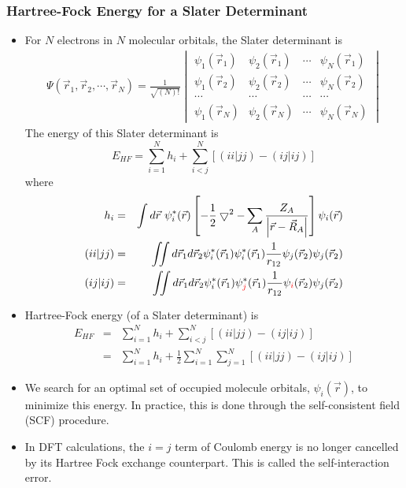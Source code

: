 \documentclass[handout]{beamer} %
\begin{document}
\begin{frame}
\frametitle{Hartree-Fock Energy for a Slater Determinant}

\begin{itemize}

\item  \small{For $N$ electrons in $N$ molecular orbitals, the Slater determinant is }
\footnotesize{
\begin{eqnarray*}
\Psi(\vec{r}_1, \vec{r}_2, \cdots, \vec{r}_N)  = \frac{1}{\sqrt{(N)!}} 
\begin{vmatrix} 
   \psi_{1} (\vec{r}_1)  &  \psi_{2} (\vec{r}_1)  & \cdots &    \psi_{N} (\vec{r}_1) \\
  \psi_{1} (\vec{r}_2)  &  \psi_{2} (\vec{r}_2)  & \cdots &    \psi_{N} (\vec{r}_2) \\
   \cdots & \cdots & \cdots & \cdots \\   
   \psi_{1} (\vec{r}_N)  &  \psi_{2} (\vec{r}_N)  & \cdots &    \psi_{N} (\vec{r}_N)
\end{vmatrix} 
\end{eqnarray*}  
}  
The energy of this Slater determinant is 
\begin{equation*}
E_{HF} = \sum_{i=1}^N h_i + \sum_{i<j}^{N} \left[ (ii|jj) - (ij|ij) \right]
\end{equation*}
where 
\scriptsize{
\begin{eqnarray*}
h_{i} & = & \int d\vec{r}~ \psi^*_i (\vec{r}) \left[ -\frac{1}{2} \bigtriangledown^2 - \sum_A \frac{Z_A}{ \left| \vec{r} - \vec{R}_A \right| } \right] \psi_i (\vec{r})  \\
(ii|jj) &  =  & \iint d\vec{r}_1 d\vec{r}_2 \psi^*_i (\vec{r}_1) \psi^*_i(\vec{r}_1) \frac{1}{r_{12}} \psi_j ( \vec{r}_2)  \psi_j(\vec{r}_2)   \\
(ij|ij) &  =  & \iint d\vec{r}_1 d\vec{r}_2 \psi^*_i (\vec{r}_1) \psi^*_{\textcolor{red}{j}}(\vec{r}_1) \frac{1}{r_{12}} \psi_{\textcolor{red}{i}} (\vec{r}_2)  \psi_j(\vec{r}_2)  
\end{eqnarray*}
}
\end{itemize}
\end{frame}

\begin{frame}
\begin{itemize}
\item \small{Hartree-Fock energy (of a Slater determinant) is }
\begin{eqnarray*}
E_{HF} & = & \sum_{i=1}^N h_i + \sum_{i<j}^{N} \left[ (ii|jj) - (ij|ij) \right]   \\
& = & \sum_{i=1}^N h_i + \frac{1}{2} \sum_{i=1}^N \sum_{j=1}^{N} \left[ (ii|jj) - (ij|ij) \right]   
\end{eqnarray*}
\item We search for an optimal set of occupied molecule orbitals, $\psi_i(\vec{r})$, to minimize this energy.   In practice, this is done through the self-consistent field (SCF) procedure. 
\item In DFT calculations, the $i=j$ term of Coulomb energy is no longer cancelled by its Hartree Fock exchange counterpart.   This is called the self-interaction error.   
\end{itemize}
\end{frame}
\end{document}
